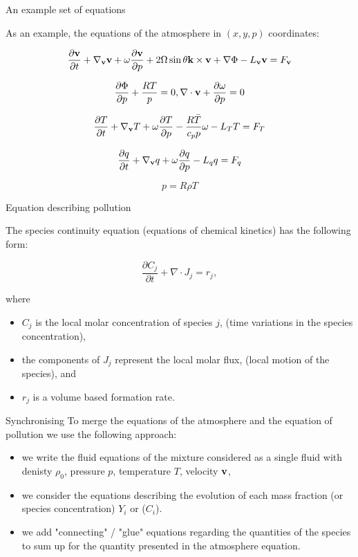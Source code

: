 \documentclass{beamer}
\begin{document}
\begin{frame}{An example set of equations}

As an example, the equations of the atmosphere in $(x, y, p)$ coordinates:

\[ \frac{\partial \bold{v}}{\partial t} + \nabla_{\bold{v}}\bold{v} + \omega \frac{\partial \bold{v}}{\partial p} + 2 \Omega \sin \theta \bold{k} \times \bold{v} + \nabla \Phi -L_{\bold{v}} \bold{v} = F_\bold{v}  \]

\[ \frac{\partial \Phi}{\partial p} + \frac{RT}{p} = 0, \nabla \cdot \bold{v} + \frac{\partial \omega}{\partial p} = 0 \]

\[ \frac{\partial T}{\partial t} + \nabla_{\bold{v}} T + \omega \frac{\partial T}{\partial p} - \frac{R \bar{T}}{c_p p} \omega - L_T T = F_T\]

\[ \frac{\partial q}{\partial t} + \nabla_{\bold{v}}q + \omega \frac{\partial q}{\partial p} -L_q q = F_q \]

\[ p = R \rho T\]

\end{frame}

\begin{frame}{Equation describing pollution}

The species continuity equation (equations of chemical kinetics) has the following form:

\[ \frac{\partial C_j}{\partial t} + \nabla \cdot J_j = r_j,\]

where

\begin{itemize}
\item $C_j$ is the local molar concentration of species $j$, (time variations in the species concentration),
\item the components of $J_j$ represent the local molar flux, (local motion of the species), and
\item $r_j$ is a volume based formation rate.
\end{itemize}

\end{frame}

\begin{frame}{Synchronising}
To merge the equations of the atmosphere and the equation of pollution we use the following approach:
\begin{itemize}
\item we write the fluid equations of the mixture considered as a single fluid with denisty $\rho_0$, pressure $p$, temperature $T$, velocity $\bold{v}$,
\item we consider the equations describing the evolution of each mass fraction (or species concentration) $Y_i$ or ($C_i$). 
\item we add "connecting" / "glue" equations regarding the quantities of the species to sum up for the quantity presented in the atmosphere equation.
\end{itemize}
\end{frame}
\end{document}
